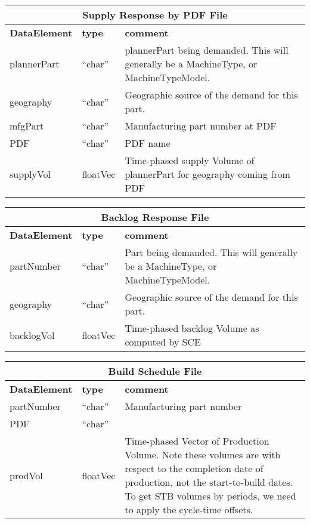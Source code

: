 \vspace{.5in}

\begin{tabular}{llp{4in}}
\multicolumn{3}{c}{{\bf Supply Response by PDF File}}\\ \hline\hline
{\bf DataElement} &  {\bf type}  &   {\bf comment} \\ \hline
plannerPart  & ``char'' &     plannerPart being demanded.  
           This will generally be a
                       MachineType, or MachineTypeModel. \\
geography   & ``char''  &    Geographic source of the demand for this part. \\
mfgPart     & ``char''  & Manufacturing part number at PDF \\
PDF         & ``char''  & PDF name \\
supplyVol   & floatVec&  Time-phased supply Volume of plannerPart for 
    geography coming from PDF  
\end{tabular}


\vspace{.5in}

\begin{tabular}{llp{4in}}
\multicolumn{3}{c}{{\bf Backlog Response File}}\\ \hline\hline
{\bf DataElement} &  {\bf type}  &   {\bf comment} \\ \hline
partNumber  & ``char'' &     Part being demanded.  This will generally be a
                       MachineType, or MachineTypeModel. \\
geography   & ``char''  &    Geographic source of the demand for this part. \\
backlogVol   & floatVec&  Time-phased backlog Volume as computed by SCE \\
\end{tabular}

\vspace{.5in}

\begin{tabular}{llp{4in}}
\multicolumn{3}{c}{{\bf Build Schedule File}}\\ \hline\hline
{\bf DataElement} &  {\bf type}  &   {\bf comment} \\ \hline
partNumber & ``char''  & Manufacturing part number \\
PDF        & ``char''  \\
prodVol    & floatVec&  Time-phased Vector of Production Volume.  Note
                      these volumes are with respect to the completion
                      date of production, not the start-to-build dates.
                      To get STB volumes by periods, we need to apply
                      the cycle-time offsets. \\
\end{tabular}

